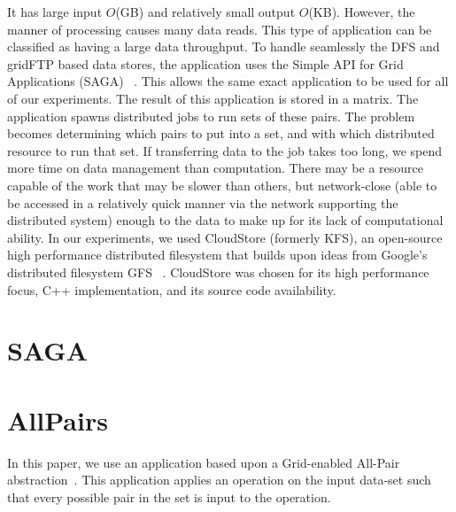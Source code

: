 \documentclass{rspublic}
\begin{document}
It has large input $O$(GB) and relatively small output $O$(KB).
However, the manner of processing causes many data reads.  This type of
application can be classified as having a large data throughput.  To
handle seamlessly the DFS and gridFTP based data stores, the application
uses the Simple API for Grid Applications (SAGA) ~\citep{saga_web}.
This allows the same exact application to be used for all of our
experiments.  The result of this application is stored in a matrix.  The
application spawns distributed jobs to run sets of these pairs.  The
problem becomes determining which pairs to put into a set, and with
which distributed resource to run that set.  If transferring data to the
job takes too long, we spend more time on data management than
computation.  There may be a resource capable of the work that may be
slower than others, but network-close (able to be accessed in a
relatively quick manner via the network supporting the distributed
system) enough to the data to make up for its lack of computational
ability.  In our experiments, we used CloudStore (formerly KFS), an
open-source high performance distributed filesystem that builds upon
ideas from Google's distributed filesystem GFS ~\citep{cloudstore_web}.
CloudStore was chosen for its high performance focus, C++
implementation, and its source code availability.

\section{SAGA} \section{AllPairs} In this paper, we use an application based upon
a Grid-enabled All-Pair abstraction~\citep{Interop, AllPairs}.  This
application applies an operation on the input data-set such that every
possible pair in the set is input to the operation.
\end{document}
